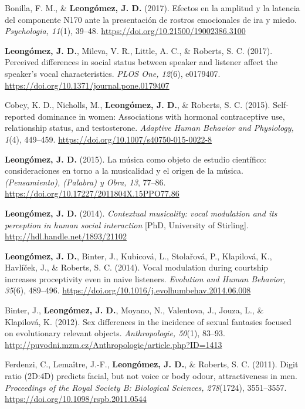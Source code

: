 \documentclass[11pt,a4paper,]{awesome-cv}
\begin{document}
\textcolor{teal}{\faStar} Bonilla, F. M., \& \textbf{Leongómez, J. D.}
(2017). Efectos en la amplitud y la latencia del componente N170 ante la
presentación de rostros emocionales de ira y miedo. \emph{Psychologia,
11}(1), 39--48. \url{https://doi.org/10.21500/19002386.3100}

\textcolor{teal}{\faStar} \textbf{Leongómez, J. D.}, Mileva, V. R.,
Little, A. C., \& Roberts, S. C. (2017). Perceived differences in social
status between speaker and listener affect the speaker's vocal
characteristics. \emph{PLOS One, 12}(6), e0179407.
\url{https://doi.org/10.1371/journal.pone.0179407}

Cobey, K. D., Nicholls, M., \textbf{Leongómez, J. D.}, \& Roberts, S. C.
(2015). Self-reported dominance in women: Associations with hormonal
contraceptive use, relationship status, and testosterone. \emph{Adaptive
Human Behavior and Physiology, 1}(4), 449--459.
\url{https://doi.org/10.1007/s40750-015-0022-8}

\textcolor{teal}{\faStar} \textbf{Leongómez, J. D.} (2015). La música
como objeto de estudio científico: consideraciones en torno a la
musicalidad y el origen de la música. \emph{(Pensamiento), (Palabra) y
Obra, 13}, 77--86. \url{https://doi.org/10.17227/2011804X.15PPO77.86}

\textcolor{teal}{\faStar} \textbf{Leongómez, J. D.} (2014).
\emph{Contextual musicality: vocal modulation and its perception in
human social interaction} {[}PhD, University of Stirling{]}.
\url{http://hdl.handle.net/1893/21102}

\textcolor{teal}{\faStar} \textbf{Leongómez, J. D.}, Binter, J.,
Kubicová, L., Stolařová, P., Klapilová, K., Havlíček, J., \& Roberts, S.
C. (2014). Vocal modulation during courtship increases proceptivity even
in naive listeners. \emph{Evolution and Human Behavior, 35}(6),
489--496. \url{https://doi.org/10.1016/j.evolhumbehav.2014.06.008}

Binter, J., \textbf{Leongómez, J. D.}, Moyano, N., Valentova, J., Jouza,
L., \& Klapilová, K. (2012). Sex differences in the incidence of sexual
fantasies focused on evolutionary relevant objects. \emph{Anthropologie,
50}(1), 83--93.
\url{http://puvodni.mzm.cz/Anthropologie/article.php?ID=1413}

Ferdenzi, C., Lemaître, J.-F., \textbf{Leongómez, J. D.}, \& Roberts, S.
C. (2011). Digit ratio (2D:4D) predicts facial, but not voice or body
odour, attractiveness in men. \emph{Proceedings of the Royal Society B:
Biological Sciences, 278}(1724), 3551--3557.
\url{https://doi.org/10.1098/rspb.2011.0544}
\end{document}
